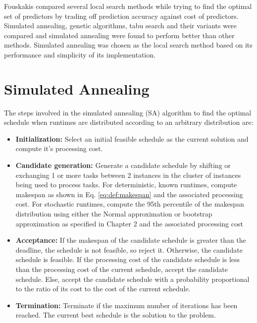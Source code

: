 \documentclass[12pt]{report}
\begin{document}
Fouskakis \cite{Fouskakis2001} compared several local search methods while trying to find the optimal set of predictors by trading off prediction accuracy against cost of predictors. 
Simulated annealing, genetic algorithms, tabu search and their variants were compared and simulated annealing were found to perform better than other methods.
Simulated annealing was chosen as the local search method based on its performance and simplicity of its implementation.

\section{Simulated Annealing}

The steps involved in the simulated annealing (SA) algorithm to find the optimal schedule when runtimes are distributed according to an arbitrary distribution are:
\begin{itemize}
	\item \textbf{Initialization:} Select an initial feasible schedule as the current solution and compute it's processing cost.
	\item \textbf{Candidate generation:} Generate a candidate schedule by shifting or exchanging 1 or more tasks between 2 instances in the cluster of instances being used to process tasks. 
		For deterministic, known runtimes, compute makespan as shown in Eq. \ref{eq:def:makespan} and the associated processing cost.
		For stochastic runtimes, compute the 95th percentile of the makespan distribution using either the Normal approximation or bootstrap approximation as specified in Chapter 2 and the associated processing cost
	\item \textbf{Acceptance:} If the makespan of the candidate schedule is greater than the deadline, the schedule is not feasible, so reject it.
		Otherwise, the candidate schedule is feasible.
		If the processing cost of the candidate schedule is less than the processing cost of the current schedule, accept the candidate schedule.
		Else, accept the candidate schedule with a probability proportional to the ratio of its cost to the cost of the current schedule.
	\item \textbf{Termination:} Terminate if the maximum number of iterations has been reached. The current best schedule is the solution to the problem.
\end{itemize}
\end{document}
